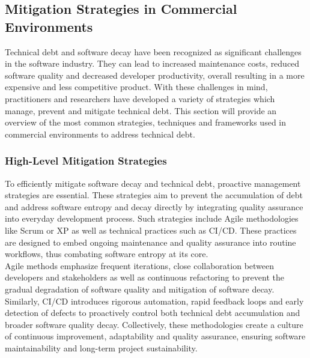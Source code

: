 \subsection{Mitigation Strategies in Commercial Environments}
Technical debt and software decay have been recognized as significant challenges in the software industry. They can lead to 
increased maintenance costs, reduced software quality and decreased developer productivity, overall resulting in a more expensive and less competitive product.
With these challenges in mind, practitioners and researchers have developed a variety of strategies which manage, prevent and mitigate technical debt.
This section will provide an overview of the most common strategies, techniques and frameworks used in commercial environments to address technical debt.\\

\subsubsection{High-Level Mitigation Strategies}
To efficiently mitigate software decay and technical debt, proactive management strategies are essential. These strategies aim to prevent the accumulation of 
debt and address software entropy and decay directly by integrating quality assurance into everyday development process.
Such strategies include Agile methodologies like Scrum or \ac{XP} as well as technical practices
such as \ac{CI/CD}. These practices are designed to embed ongoing maintenance and quality assurance into routine workflows, thus combating software entropy at its core.\\
Agile methods emphasize frequent iterations, close collaboration between developers and stakeholders as well as continuous refactoring to prevent the
gradual degradation of software quality and mitigation of software decay.\\
Similarly, \ac{CI/CD} introduces rigorous automation, rapid feedback loops and early detection of defects to proactively control both technical debt accumulation
and broader software quality decay. Collectively, these methodologies create a culture of continuous improvement, adaptability and quality assurance, 
ensuring software maintainability and long-term project sustainability.\\

